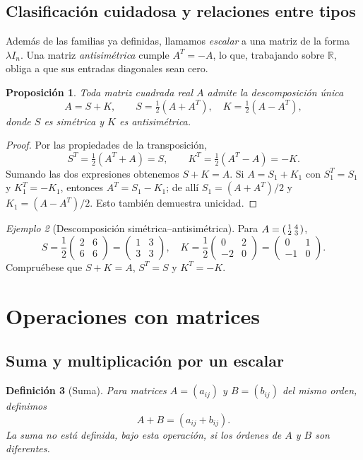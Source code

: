 \documentclass[12pt]{article}
\newtheorem{definicion}{Definición}[section]
\newtheorem{proposicion}[definicion]{Proposición}
\theoremstyle{remark}
\newtheorem{ejemplo}[definicion]{Ejemplo}
\newcommand{\R}{\mathbb{R}}
\begin{document}
\subsection{Clasificación cuidadosa y relaciones entre tipos}
Además de las familias ya definidas, llamamos \emph{escalar} a una matriz de la forma $\lambda I_n$. Una matriz \emph{antisimétrica} cumple $A^T=-A$, lo que, trabajando sobre $\R$, obliga a que sus entradas diagonales sean cero.
\begin{proposicion}
Toda matriz cuadrada real $A$ admite la descomposición única
\[
\boxed{A=S+K,\qquad S=\tfrac12(A+A^T),\quad K=\tfrac12(A-A^T),}
\]
donde $S$ es simétrica y $K$ es antisimétrica.
\end{proposicion}
\begin{proof}
Por las propiedades de la transposición,
\[
S^T=\tfrac12(A^T+A)=S,\qquad K^T=\tfrac12(A^T-A)=-K.
\]
Sumando las dos expresiones obtenemos $S+K=A$. Si $A=S_1+K_1$ con $S_1^T=S_1$ y $K_1^T=-K_1$, entonces $A^T=S_1-K_1$; de allí $S_1=(A+A^T)/2$ y $K_1=(A-A^T)/2$. Esto también demuestra unicidad.
\end{proof}
\begin{ejemplo}[Descomposición simétrica--antisimétrica]
Para $A=\begin{psmallmatrix}1&4\\2&3\end{psmallmatrix}$,
\[
S=\frac12\begin{pmatrix}2&6\\6&6\end{pmatrix}=\begin{pmatrix}1&3\\3&3\end{pmatrix},\quad
K=\frac12\begin{pmatrix}0&2\\-2&0\end{pmatrix}=\begin{pmatrix}0&1\\-1&0\end{pmatrix}.
\]
Compruébese que $S+K=A$, $S^T=S$ y $K^T=-K$.
\end{ejemplo}


\section{Operaciones con matrices}
\subsection{Suma y multiplicación por un escalar}
\begin{definicion}[Suma]
Para matrices $A=(a_{ij})$ y $B=(b_{ij})$ del \emph{mismo orden}, definimos
\[
A+B=(a_{ij}+b_{ij}).
\]
La suma no está definida, bajo esta operación, si los órdenes de $A$ y $B$ son diferentes.
\end{definicion}
\end{document}
